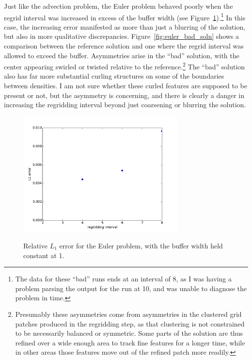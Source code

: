\documentclass[11pt]{article}
\begin{document}
Just like the advection problem, the Euler problem behaved poorly when the
regrid interval was increased in excess of the buffer width (see
Figure~\ref{fig:err_euler_bad}).\footnote{The data for these ``bad'' runs
ends at an interval of 8, as I was having a problem parsing the output
for the run at 10, and was unable to diagnose the problem in time.} In
this case, the increasing error manifested as more than just a blurring
of the solution, but also in more qualitative discrepancies. 
Figure~\ref{fig:euler_bad_soln} shows a comparison between the reference
solution and one where the regrid interval was allowed to exceed the buffer.
Asymmetries arise in the ``bad'' solution, with the center appearing
swirled or twisted relative to the reference.\footnote{Presumably these
asymmetries come from asymmetries in the clustered grid patches produced
in the regridding step, as that clustering is not constrained to be
necessarily balanced or symmetric. Some parts of the solution are thus
refined over a wide enough area to track fine features for a longer time,
while in other areas those features move out of the refined patch more
readily.}
The ``bad'' solution also
has far more substantial curling structures on some of the boundaries
between densities. I am not sure whether these curled features are
supposed to be present or not, but the asymmetry is concerning, and there
is clearly a danger in increasing the regridding interval beyond just 
coarsening or blurring the solution.

\begin{figure}[!htb]
\centering
\caption{Relative $L_1$ error for the Euler problem, with the buffer
width held constant at 1.}
\includegraphics[width=0.75\textwidth]{myclaw/l1_err_euler_bad}
\label{fig:err_euler_bad}
\end{figure}
\end{document}
